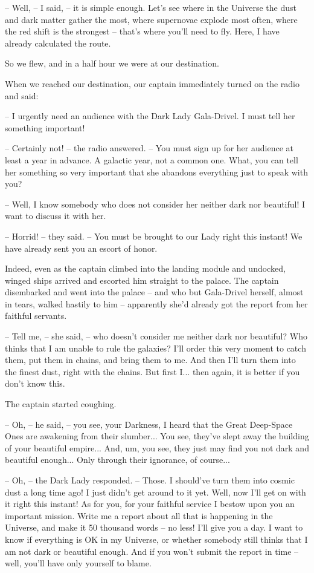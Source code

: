 \documentclass[ebook,twoside,final,openright]{memoir}
\begin{document}
– Well, – I said, – it is simple enough. Let's see where in the Universe the dust and dark matter gather the most, where supernovae explode most often, where the red shift is the strongest – that’s where you’ll need to fly. Here, I have already calculated the route.\par
So we flew, and in a half hour we were at our destination.\par
\par
When we reached our destination, our captain immediately turned on the radio and said:\par
– I urgently need an audience with the Dark Lady Gala-Drivel. I must tell her something important! \par
– Certainly not! – the radio answered. – You must sign up for her audience at least a year in advance. A galactic year, not a common one. What, you can tell her something so very important that she abandons everything just to speak with you?\par
– Well, I know somebody who does not consider her neither dark nor beautiful! I want to discuss it with her.\par
– Horrid! – they said. – You must be brought to our Lady right this instant! We have already sent you an escort of honor.\par
\par
Indeed, even as the captain climbed into the landing module and undocked, winged ships arrived and escorted him straight to the palace. The captain disembarked and went into the palace – and who but Gala-Drivel herself, almost in tears, walked hastily to him – apparently she’d already got the report from her faithful servants.\par
– Tell me, – she said, – who doesn’t consider me neither dark nor beautiful? Who thinks that I am unable to rule the galaxies? I’ll order this very moment to catch them, put them in chains, and bring them to me. And then I’ll turn them into the finest dust, right with the chains. But first I... then again, it is better if you don’t know this.\par
The captain started coughing.\par
– Oh, – he said, – you see, your Darkness, I heard that the Great Deep-Space Ones are awakening from their slumber... You see, they’ve slept away the building of your beautiful empire... And, um, you see, they just may find you not dark and beautiful enough... Only through their ignorance, of course...\par
– Oh, – the Dark Lady responded. – Those. I should’ve turn them into cosmic dust a long time ago! I just didn’t get around to it yet. Well, now I’ll get on with it right this instant! As for you, for your faithful service I bestow upon you an important mission. Write me a report about all that is happening in the Universe, and make it 50 thousand words – no less! I’ll give you a day. I want to know if everything is OK in my Universe, or whether somebody still thinks that I am not dark or beautiful enough. And if you won’t submit the report in time – well, you’ll have only yourself to blame.\par
\end{document}
